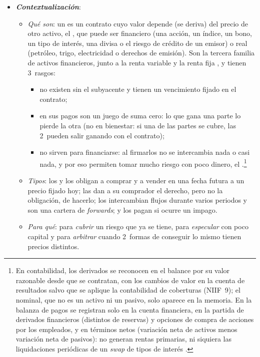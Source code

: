 \documentclass[11pt]{article}
\begin{document}
\begin{itemize}
\item \textbf{\emph{Contextualización}}:
  \begin{itemize}
  \item \emph{Qué son}: un  es un contrato cuyo valor depende (se deriva) del precio de otro activo, el , que puede ser financiero (una acción, un índice, un bono, un tipo de interés, una divisa o el riesgo de crédito de un emisor) o real (petróleo, trigo, electricidad o derechos de emisión). Son la tercera familia de activos financieros, junto a la renta variable  y la renta fija , y tienen 3~rasgos:
    \begin{itemize}
    \item no existen sin el subyacente y tienen un vencimiento fijado en el contrato;
    \item en sus pagos son un juego de suma cero: lo que gana una parte lo pierde la otra (no en bienestar: si una de las partes se cubre, las 2~pueden salir ganando con el contrato);
    \item no sirven para financiarse: al firmarlos no se intercambia nada o casi nada, y por eso permiten tomar mucho riesgo con poco dinero, el .\footnote{En contabilidad, los derivados se reconocen en el balance por su valor razonable desde que se contratan, con los cambios de valor en la cuenta de resultados salvo que se aplique la contabilidad de coberturas (NIIF~9); el nominal, que no es un activo ni un pasivo, solo aparece en la memoria. En la balanza de pagos se registran solo en la cuenta financiera, en la partida de derivados financieros (distintos de reservas) y opciones de compra de acciones por los empleados, y en términos netos (variación neta de activos menos variación neta de pasivos): no generan rentas primarias, ni siquiera las liquidaciones periódicas de un \emph{swap} de tipos de interés\nocite{FMI2009MBP6} .}
    \end{itemize}
  \item \emph{Tipos}: los  y los  obligan a comprar y a vender en una fecha futura a un precio fijado hoy; las  dan a su comprador el derecho, pero no la obligación, de hacerlo; los  intercambian flujos durante varios periodos y son una cartera de \emph{forwards}; y los  pagan si ocurre un impago.
  \item \emph{Para qué}: para \emph{cubrir} un riesgo que ya se tiene, para \emph{especular} con poco capital y para \emph{arbitrar} cuando 2~formas de conseguir lo mismo tienen precios distintos\nocite{Hull2022Options}.

\end{itemize}
\end{itemize}
\end{document}
